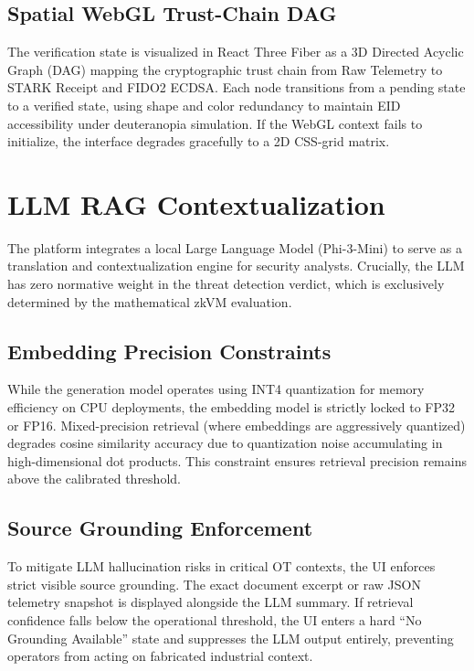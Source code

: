 \documentclass[12pt,a4paper]{article}
\begin{document}
\subsection{Spatial WebGL Trust-Chain DAG}

The verification state is visualized in React Three Fiber as a 3D Directed
Acyclic Graph (DAG) mapping the cryptographic trust chain from Raw Telemetry
to STARK Receipt and FIDO2 ECDSA. Each node transitions from a pending state
to a verified state, using shape and color redundancy to maintain EID
accessibility under deuteranopia simulation. If the WebGL context fails to
initialize, the interface degrades gracefully to a 2D CSS-grid matrix.

\section{LLM RAG Contextualization}

The platform integrates a local Large Language Model (Phi-3-Mini) to serve as a
translation and contextualization engine for security analysts. Crucially,
the LLM has zero normative weight in the threat detection verdict, which is
exclusively determined by the mathematical zkVM evaluation.

\subsection{Embedding Precision Constraints}

While the generation model operates using INT4 quantization for memory efficiency
on CPU deployments, the embedding model is strictly locked to FP32 or FP16.
Mixed-precision retrieval (where embeddings are aggressively quantized)
degrades cosine similarity accuracy due to quantization noise accumulating
in high-dimensional dot products. This constraint ensures retrieval precision
remains above the calibrated threshold.

\subsection{Source Grounding Enforcement}

To mitigate LLM hallucination risks in critical OT contexts, the UI enforces
strict visible source grounding. The exact document excerpt or raw JSON telemetry
snapshot is displayed alongside the LLM summary. If retrieval confidence falls
below the operational threshold, the UI enters a hard ``No Grounding Available''
state and suppresses the LLM output entirely, preventing operators from acting
on fabricated industrial context.
\end{document}
